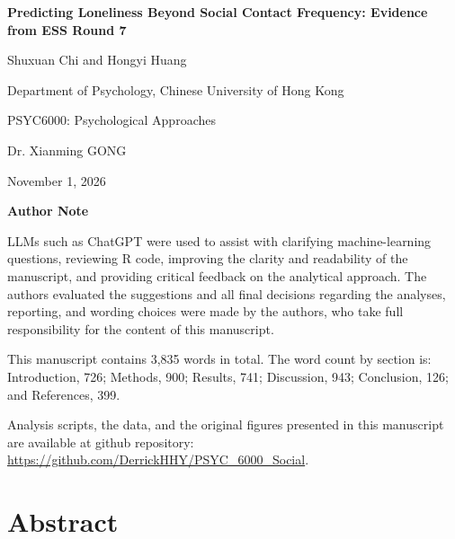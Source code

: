 \documentclass[12pt]{article}
\begin{document}

\begin{center}
  \vspace*{1in}

  \textbf{Predicting Loneliness Beyond Social Contact Frequency: Evidence from ESS Round 7}

  \vspace{\baselineskip}

  Shuxuan Chi and Hongyi Huang

  Department of Psychology, Chinese University of Hong Kong

  PSYC6000: Psychological Approaches

  Dr. Xianming GONG

  November 1, 2026
\end{center}

\vfill

\begin{center}
  \textbf{Author Note}
\end{center}

LLMs such as ChatGPT were used to assist with clarifying machine-learning questions, reviewing R code, 
improving the clarity and readability of the manuscript, and providing critical feedback on the analytical 
approach. The authors evaluated the suggestions and all final decisions regarding the analyses, reporting, 
and wording choices were made by the authors, who take full responsibility for the content of this manuscript.

This manuscript contains 3,835 words in total. The word count by section is: 
Introduction, 726; Methods, 900; Results, 741; Discussion, 943; Conclusion, 126; and References, 399.

Analysis scripts, the data, and the original figures
presented in this manuscript are available at github repository: \url{https://github.com/DerrickHHY/PSYC_6000_Social}.
\newpage

\section{Abstract}
\end{document}

